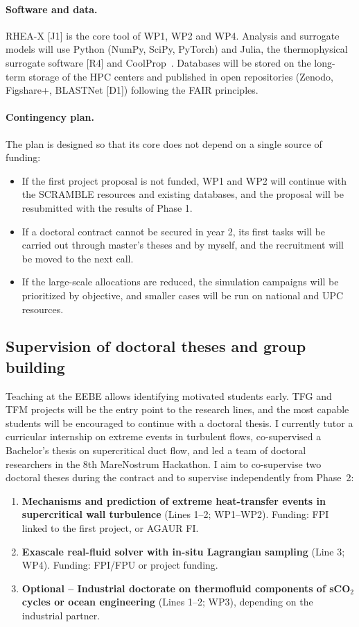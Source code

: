 \documentclass[11pt]{article}
\begin{document}
\paragraph{Software and data.} RHEA-X [J1] is the core tool of WP1, WP2 and WP4. Analysis
and surrogate models will use Python (NumPy, SciPy, PyTorch) and Julia, the thermophysical
surrogate software [R4] and CoolProp~\cite{CoolProp2014}. Databases will be stored on the
long-term storage of the HPC centers and published in open repositories (Zenodo,
Figshare+, BLASTNet [D1]) following the FAIR principles.

\paragraph{Contingency plan.} The plan is designed so that its core does not depend on a
single source of funding:
\begin{itemize}
  \item If the first project proposal is not funded, WP1 and WP2 will continue with the
  SCRAMBLE resources and existing databases, and the proposal will be resubmitted with the
  results of Phase 1.
  \item If a doctoral contract cannot be secured in year 2, its first tasks will be
  carried out through master's theses and by myself, and the recruitment will be moved to
  the next call.
  \item If the large-scale allocations are reduced, the simulation campaigns will be
  prioritized by objective, and smaller cases will be run on national and UPC resources.
\end{itemize}

\subsection{Supervision of doctoral theses and group building}
Teaching at the EEBE allows identifying motivated students early. TFG and TFM projects
will be the entry point to the research lines, and the most capable students will be
encouraged to continue with a doctoral thesis. I currently tutor a curricular internship
on extreme events in turbulent flows, co-supervised a Bachelor's thesis on supercritical
duct flow, and led a team of doctoral researchers in the 8th MareNostrum Hackathon. I aim
to co-supervise two doctoral theses during the contract and to supervise independently
from Phase~2:
\begin{enumerate}
  \item \textbf{Mechanisms and prediction of extreme heat-transfer events in supercritical
  wall turbulence} (Lines 1--2; WP1--WP2). Funding: FPI linked to the first project, or
  AGAUR FI.
  \item \textbf{Exascale real-fluid solver with in-situ Lagrangian sampling} (Line 3;
  WP4). Funding: FPI/FPU or project funding.
  \item \textbf{Optional -- Industrial doctorate on thermofluid components of sCO$_2$
  cycles or ocean engineering} (Lines 1--2; WP3), depending on the industrial partner.
\end{enumerate}
\end{document}
